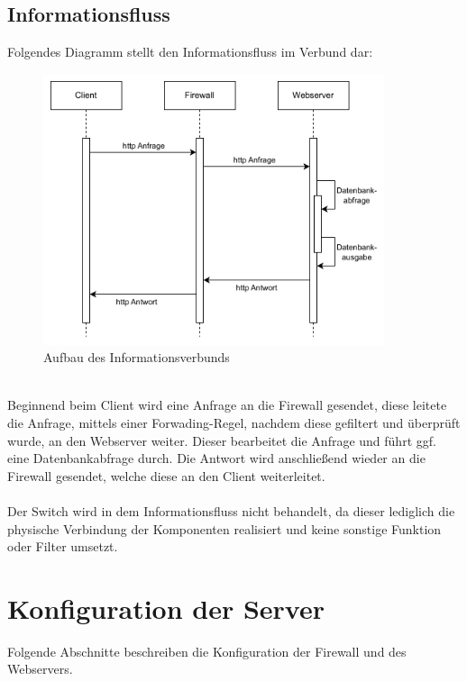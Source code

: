 \documentclass[
    a4paper,
    pagesize,
	pdftex,
    12pt,
]{scrartcl}
\begin{document}
\subsection{Informationsfluss}
Folgendes Diagramm stellt den Informationsfluss im Verbund dar:
\begin{figure}[!ht]
	\centering
	\includegraphics[width=10cm]{informationsfluss.png}
	\caption{Aufbau des Informationsverbunds}
	\label{fig:boat2}
\end{figure}
\\
Beginnend beim Client wird eine Anfrage an die Firewall gesendet, diese leitete die Anfrage, mittels einer Forwading-Regel, nachdem diese gefiltert und überprüft wurde, an den Webserver weiter. Dieser bearbeitet die Anfrage und führt ggf. eine Datenbankabfrage durch. Die Antwort wird anschließend wieder an die Firewall gesendet, welche diese an den Client weiterleitet. 
\\ \\
Der Switch wird in dem Informationsfluss nicht behandelt, da dieser lediglich die physische Verbindung der Komponenten realisiert und keine sonstige Funktion oder Filter umsetzt.

\newpage
\section{Konfiguration der Server}
Folgende Abschnitte beschreiben die Konfiguration der Firewall und des Webservers.
\end{document}
